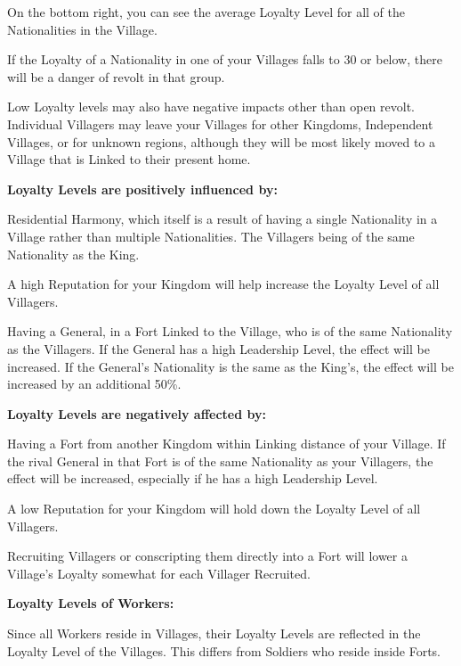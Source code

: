 On the bottom right, you can see the average Loyalty Level for all of the Nationalities in the Village.

If the Loyalty of a Nationality in one of your Villages falls to 30 or below, there will be a danger of revolt in that group.

Low Loyalty levels may also have negative impacts other than open revolt. Individual Villagers may leave your Villages for other Kingdoms, Independent Villages, or for unknown regions, although they will be most likely moved to a Village that is Linked to their present home.

\textbf{Loyalty Levels are positively influenced by:}

\begin{changemargin}{.5cm}{0cm}
Residential Harmony, which itself is a result of having a single Nationality in a Village rather than multiple Nationalities. The Villagers being of the same Nationality as the King.

A high Reputation for your Kingdom will help increase the Loyalty Level of all Villagers.

Having a General, in a Fort Linked to the Village, who is of the same Nationality as the Villagers. If the General has a high Leadership Level, the effect will be increased. If the General’s Nationality is the same as the King’s, the effect will be increased by an additional 50\%.
\end{changemargin}

\textbf{Loyalty Levels are negatively affected by:}

\begin{changemargin}{.5cm}{0cm}
Having a Fort from another Kingdom within Linking distance of your Village. If the rival General in that Fort is of the same Nationality as your Villagers, the effect will be increased, especially if he has a high Leadership Level.

A low Reputation for your Kingdom will hold down the Loyalty Level of all Villagers.

Recruiting Villagers or conscripting them directly into a Fort will lower a Village’s Loyalty somewhat for each Villager Recruited.
\end{changemargin}

\textbf{Loyalty Levels of Workers:}

\begin{changemargin}{.5cm}{0cm}
Since all Workers reside in Villages, their Loyalty Levels are reflected in the Loyalty Level of the Villages. This differs from Soldiers who reside inside Forts.
\end{changemargin}

